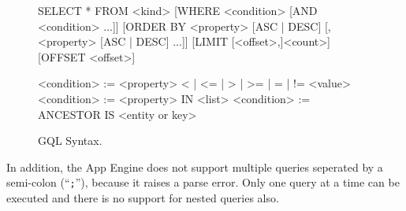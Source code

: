 \begin{figure*}[ht] %
\begin{center}
\begin{code}
  SELECT * FROM <kind>
    [WHERE <condition> [AND <condition> ...]]
    [ORDER BY <property> [ASC | DESC] [, <property> [ASC | DESC] ...]]
    [LIMIT [<offset>,]<count>]
    [OFFSET <offset>]

  <condition> := <property> {< | <= | > | >= | = | != } <value>
  <condition> := <property> IN <list>
  <condition> := ANCESTOR IS <entity or key>
\end{code}
\caption{GQL Syntax.\label{gql-syntax}}
\end{center}
\end{figure*}

In addition, the App Engine does not support multiple queries seperated by a
semi-colon (``\texttt{;}''), because it raises a parse error. Only one query at
a time can be executed and there is no support for nested queries also.
